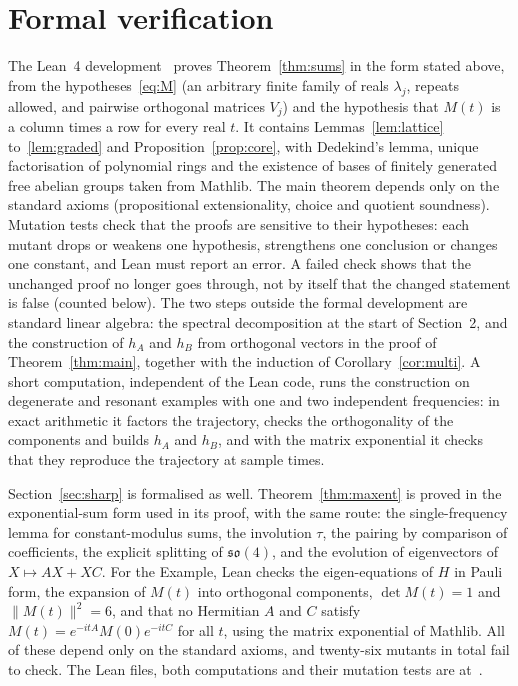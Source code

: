 \documentclass[11pt]{article}
\theoremstyle{remark}
\begin{document}
\section{Formal verification}

The Lean~4 development~\cite{mathlib} proves Theorem~\ref{thm:sums} in the form stated above,
from the hypotheses~\eqref{eq:M} (an arbitrary finite family of reals $\lambda_j$, repeats
allowed, and pairwise orthogonal matrices $V_j$) and the hypothesis that $M(t)$ is a column
times a row for every real $t$. It contains Lemmas~\ref{lem:lattice} to~\ref{lem:graded} and
Proposition~\ref{prop:core}, with Dedekind's lemma, unique factorisation of polynomial rings
and the existence of bases of finitely generated free abelian groups taken from Mathlib. The
main theorem depends only on the standard axioms (propositional extensionality, choice and
quotient soundness). Mutation tests check that the proofs are sensitive to their hypotheses:
each mutant drops or weakens one hypothesis, strengthens one conclusion or changes one
constant, and Lean must report an error. A failed check shows that the unchanged proof no
longer goes through, not by itself that the changed statement is false (counted below). The two steps outside the formal development are standard
linear algebra: the spectral decomposition at the start of Section~2, and the construction of
$h_A$ and $h_B$ from orthogonal vectors in the proof of Theorem~\ref{thm:main}, together with
the induction of Corollary~\ref{cor:multi}. A short computation, independent of the Lean code,
runs the construction on degenerate and resonant examples with one and two independent
frequencies: in exact arithmetic it factors the trajectory, checks the orthogonality of the
components and builds $h_A$ and $h_B$, and with the matrix exponential it checks that they
reproduce the trajectory at sample times.

Section~\ref{sec:sharp} is formalised as well. Theorem~\ref{thm:maxent} is proved in the
exponential-sum form used in its proof, with the same route: the single-frequency lemma for
constant-modulus sums, the involution $\tau$, the pairing by comparison of coefficients, the
explicit splitting of $\mathfrak{so}(4)$, and the evolution of eigenvectors of $X\mapsto AX+XC$.
For the Example, Lean checks the eigen-equations of $H$ in Pauli form, the expansion of
$M(t)$ into orthogonal components, $\det M(t)=1$ and $\lVert M(t)\rVert^2=6$, and that no
Hermitian $A$ and $C$ satisfy $M(t)=e^{-itA}M(0)e^{-itC}$ for all $t$, using the matrix
exponential of Mathlib. All of these depend only on the standard axioms, and twenty-six mutants
in total fail to check. The Lean files, both computations and their mutation tests are
at~\cite{repo}.
\end{document}

